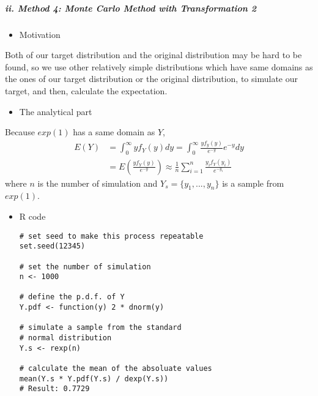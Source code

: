 \documentclass[12pt]{article}
\begin{document}
\hypertarget{ii.-method-4-monte-carlo-method-with-transformation-2}{%
\subparagraph{ii. Method 4: Monte Carlo Method with Transformation
2}\label{ii.-method-4-monte-carlo-method-with-transformation-2}}

\begin{itemize}
\tightlist
\item
  Motivation
\end{itemize}

Both of our target distribution and the original distribution may be
hard to be found, so we use other relatively simple distributions which
have same domains as the ones of our target distribution or the original
distribution, to simulate our target, and then, calculate the
expectation.

\begin{itemize}
\tightlist
\item
  The analytical part
\end{itemize}

Because \(exp(1)\) has a same domain as \(Y\), \begin{equation*}
                \begin{split}
                    E(Y) &= \int_{0}^{\infty}yf_Y(y)dy = \int_{0}^{\infty}\frac{yf_y(y)}{e^{-y}}e^{-y}dy \\
                    &
                    = E(\frac{yf_Y(y)}{e^{-y}}) \approx \frac{1}{n}\sum_{i=1}^{n}\frac{y_if_Y(y_i)}{e^{-y_i}}
                \end{split}
                \end{equation*} where \(n\) is the number of simulation
and \(Y_s = \{y_1, ..., y_n\}\) is a sample from \(exp(1)\).

\begin{itemize}
\item
  R code

\begin{verbatim}
# set seed to make this process repeatable
set.seed(12345)

# set the number of simulation
n <- 1000

# define the p.d.f. of Y
Y.pdf <- function(y) 2 * dnorm(y)

# simulate a sample from the standard 
# normal distribution
Y.s <- rexp(n)

# calculate the mean of the absoluate values
mean(Y.s * Y.pdf(Y.s) / dexp(Y.s))
# Result: 0.7729
\end{verbatim}
\end{itemize}
\end{document}
